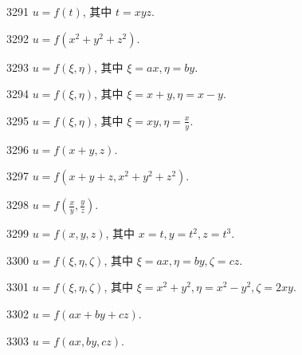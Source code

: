 \begin{prob}[S]{3291}
$u = f(t)$, 其中 $t = xyz$.
\end{prob}

\begin{prob}[S]{3292}
$u = f(x^2 + y^2 + z^2)$.
\end{prob}

\begin{prob}[S]{3293}
$u = f(\xi, \eta)$, 其中 $\xi = ax, \eta = by$.
\end{prob}

\begin{prob}[S]{3294}
$u = f(\xi, \eta)$, 其中 $\xi = x + y, \eta = x - y$.
\end{prob}

\begin{prob}[S]{3295}
$u = f(\xi, \eta)$, 其中 $\xi = xy, \eta = \frac{x}{y}$.
\end{prob}

\begin{prob}[S]{3296}
$u = f(x + y, z)$.
\end{prob}

\begin{prob}[S]{3297}
$u = f(x + y + z, x^2 + y^2 + z^2)$.
\end{prob}

\begin{prob}[S]{3298}
$u = f\left(\frac{x}{y}, \frac{y}{z}\right)$.
\end{prob}

\begin{prob}[S]{3299}
$u = f(x, y, z)$, 其中 $x = t, y = t^2, z = t^3$.
\end{prob}

\begin{prob}[S]{3300}
$u = f(\xi, \eta, \zeta)$, 其中 $\xi = ax, \eta = by, \zeta = cz$.
\end{prob}

\begin{prob}[S]{3301}
$u = f(\xi, \eta, \zeta)$, 其中 $\xi = x^2 + y^2, \eta = x^2 - y^2, \zeta = 2xy$.
\end{prob}


\begin{prob}[S]{3302}
$u = f(ax + by + cz)$.
\end{prob}

\begin{prob}[S]{3303}
$u = f(ax, by, cz)$.
\end{prob}

